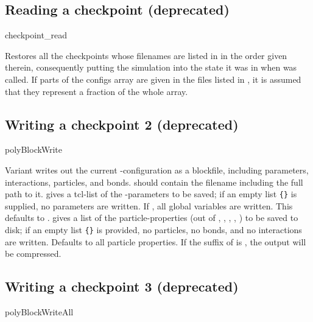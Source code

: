 \subsection{Reading a checkpoint (deprecated)}
\begin{essyntax}
  checkpoint_read 
\end{essyntax}
Restores all the checkpoints whose filenames are listed in
 in the order given therein, consequently putting the
simulation into the state it was in when  was
called. If parts of the configs array are given in the files listed in
, it is assumed that they represent a fraction of the
whole array.

\subsection{Writing a checkpoint 2 (deprecated)}
\begin{essyntax}
   polyBlockWrite  
   
\end{essyntax}

Variant  writes out the current \es-configuration as a
blockfile, including parameters, interactions, particles, and bonds.
 should contain the filename including the full path to it.
 gives a tcl-list of the \es-parameters to be saved;
if an empty list \verb!{}! is supplied, no parameters are written.  If
, all global variables are written. This defaults to
.  gives a list of the particle-properties
(out of , , , , ) to be saved
to disk; if an empty list \verb!{}! is provided, no particles, no
bonds, and no interactions are written.  Defaults to all particle
properties.  If the suffix of  is , the output will
be compressed.

\subsection{Writing a checkpoint 3 (deprecated)}
\begin{essyntax}
   polyBlockWriteAll  
  
\end{essyntax}

